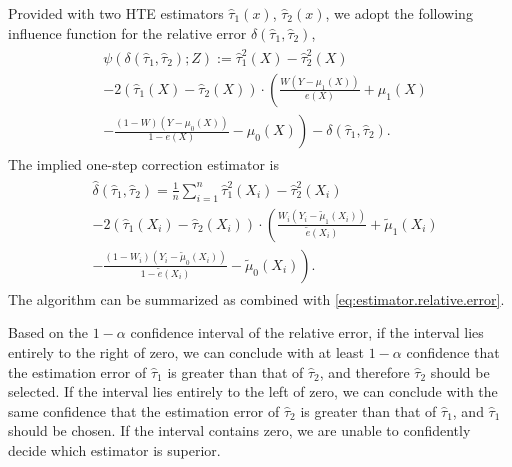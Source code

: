 \documentclass[twoside]{article}
\newcommand{\1}{{\mathbbm{1}}}
\begin{document}
Provided with two HTE estimators $\hat{\tau}_1(x)$, $\hat{\tau}_2(x)$, we adopt the following influence function for the relative error $\delta(\hat{\tau}_1, \hat{\tau}_2)$,
\begin{align}\label{eq:EIF.relative} 
\begin{split}    
    &\psi(\delta(\hat{\tau}_1, \hat{\tau}_2); Z)
    := \hat{\tau}_1^2(X) - \hat{\tau}_2^2(X) \\
    &- 2\left(\hat{\tau}_1(X) - \hat{\tau}_2(X)\right) \cdot 
    \left(\frac{W(Y - \mu_1(X))}{e(X)} + \mu_1(X) \right.\\
    &\left.- \frac{(1-W)(Y - \mu_0(X))}{1-e(X)} - \mu_0(X)\right)
    - \delta(\hat{\tau}_1, \hat{\tau}_2).
\end{split}
\end{align}
The implied one-step correction estimator is
\begin{align}\label{eq:estimator.relative.error}
\begin{split}    
    &\hat{\delta}(\hat{\tau}_1, \hat{\tau}_2)
    = \frac{1}{n} \sum_{i=1}^n \hat{\tau}_1^2(X_i) - \hat{\tau}_2^2(X_i) \\
    &- 2\left(\hat{\tau}_1(X_i) - \hat{\tau}_2(X_i)\right) \cdot \left(\frac{W_i(Y_i - \tilde{\mu}_1(X_i))}{\tilde{e}(X_i)} + \tilde{\mu}_1(X_i) \right.\\
    &\left. - \frac{(1-W_i)(Y_i - \tilde{\mu}_0(X_i))}{1-\tilde{e}(X_i)} - \tilde{\mu}_0(X_i)\right).
\end{split}
\end{align}
The algorithm can be summarized as  combined with \eqref{eq:estimator.relative.error}.


Based on the $1-\alpha$ confidence interval of the relative error, if the interval lies entirely to the right of zero, we can conclude with at least $1-\alpha$ confidence that the estimation error of $\hat{\tau}_1$ is greater than that of $\hat{\tau}_2$, and therefore $\hat{\tau}_2$ should be selected. 
If the interval lies entirely to the left of zero, we can conclude with the same confidence that the estimation error of $\hat{\tau}_2$ is greater than that of $\hat{\tau}_1$, and $\hat{\tau}_1$ should be chosen. 
If the interval contains zero, we are unable to confidently decide which estimator is superior.
\end{document}
